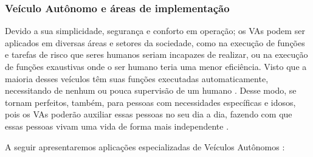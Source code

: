 \subsubsection{Veículo Autônomo e áreas de implementação} \label{implementacao}

Devido a sua simplicidade, segurança e conforto em operação; os VAs podem ser aplicados em diversas áreas e setores da sociedade, como na execução de funções e tarefas de risco que seres humanos seriam incapazes de realizar, ou na execução de funções exaustivas onde o ser humano teria uma menor eficiência. Visto que a maioria desses veículos têm suas funções executadas automaticamente, necessitando de nenhum ou pouca supervisão de um humano \cite{mundobrasil}. Desse modo, se tornam perfeitos, também, para pessoas com necessidades específicas e idosos, pois os VAs poderão auxiliar essas pessoas no seu dia a dia, fazendo com que essas pessoas vivam uma vida de forma mais independente \cite{4cenarios_ocidental}. 
\vspace {1cm}

A seguir apresentaremos aplicações especializadas de Veículos Autônomos \cite{aplicacao2}:

